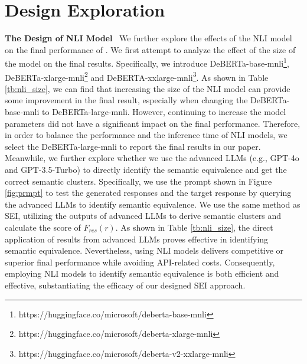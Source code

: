\section{Design Exploration}
\label{appendix:design}


\textbf{The Design of NLI Model}
\
We further explore the effects of the NLI model on the final performance of \OURS.
We first attempt to analyze the effect of the size of the model on the final results.
Specifically, we introduce DeBERTa-base-mnli\footnote{https://huggingface.co/microsoft/deberta-base-mnli}, DeBERTa-xlarge-mnli\footnote{https://huggingface.co/microsoft/deberta-xlarge-mnli} and DeBERTA-xxlarge-mnli\footnote{https://huggingface.co/microsoft/deberta-v2-xxlarge-mnli}.
As shown in Table \ref{tb:nli_size}, we can find that increasing the size of the NLI model can provide some improvement in the final result, especially when changing the DeBERTa-base-mnli to DeBERTa-large-mnli.
However, continuing to increase the model parameters did not have a significant impact on the final performance. 
Therefore, in order to balance the performance and the inference time of NLI models, we select the DeBERTa-large-mnli to report the final results in our paper.
Meanwhile, we further explore whether we use the advanced LLMs (e.g., GPT-4o and GPT-3.5-Turbo) to directly identify the semantic equivalence and get the correct semantic clusters.
Specifically, we use the prompt shown in Figure \ref{fig:prmpt} to test the generated responses and the target response by querying the advanced LLMs to identify semantic equivalence.
We use the same method as SEI, utilizing the outputs of advanced LLMs to derive semantic clusters and calculate the score of $F_{res}(r)$.
As shown in Table \ref{tb:nli_size}, the direct application of results from advanced LLMs proves effective in identifying semantic equivalence.
Nevertheless, using NLI models delivers competitive or superior final performance while avoiding API-related costs.
Consequently, employing NLI models to identify semantic equivalence is both efficient and effective, substantiating the efficacy of our designed SEI approach.



